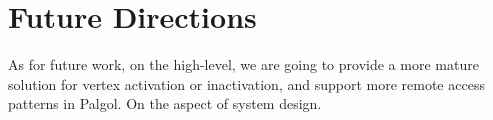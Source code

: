 \documentclass{sokendai_thesis} %
\begin{document}
\section{Future Directions}

As for future work, on the high-level, we are going to provide a more mature solution for vertex activation or inactivation, and support more remote access patterns in Palgol.
On the aspect of system design.






%





\begin{appendices}

%

\end{appendices}
\end{document}
